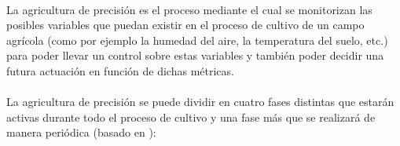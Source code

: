 \documentclass[../../memoria.tex]{subfiles}
\begin{document}
\paragraph{}
La agricultura de precisión es el proceso mediante el cual se monitorizan las posibles variables que puedan existir en el proceso de cultivo de un campo agrícola (como por ejemplo la humedad del aire, la temperatura del suelo, etc.) para poder llevar un control sobre estas variables y también poder decidir una futura actuación en función de dichas métricas.

\paragraph{}
La agricultura de precisión se puede dividir en cuatro fases distintas que estarán activas durante todo el proceso de cultivo y una fase más que se realizará de manera periódica (basado en \cite{qampo}):
\end{document}
